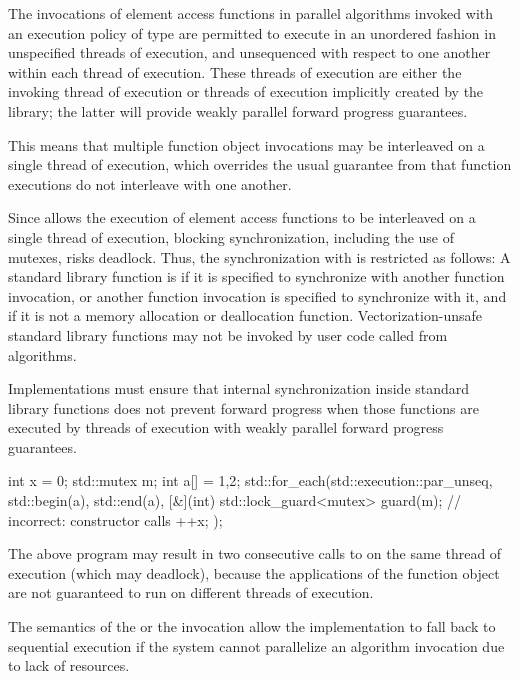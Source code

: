 \pnum
The invocations of element access functions in parallel algorithms invoked with
an execution policy of type  are
permitted to execute in an unordered fashion in unspecified threads of execution, and
unsequenced with respect to one another within each thread of execution.
These threads of execution are either the invoking thread of execution or threads of
execution implicitly created by the library; the latter will provide weakly parallel
forward progress guarantees.
\begin{note}
This means that multiple function object invocations may be interleaved on a
single thread of execution, which overrides the usual guarantee from 
that function executions do not interleave with one another.
\end{note}
Since  allows the execution of element
access functions to be interleaved on a single thread of execution, blocking synchronization,
including the use of mutexes, risks deadlock. Thus, the synchronization with
 is restricted as
follows:
A standard library function is  if it is specified
to synchronize with another function invocation, or another function invocation
is specified to synchronize with it, and if it is not a memory allocation or
deallocation function. Vectorization-unsafe standard library functions may not
be invoked by user code called from 
algorithms.
\begin{note}
Implementations must ensure that internal synchronization inside standard
library functions does not prevent forward progress when those functions are
executed by threads of execution with weakly parallel forward progress guarantees.
\end{note}
\begin{example}
\begin{codeblock}
int x = 0;
std::mutex m;
int a[] = {1,2};
std::for_each(std::execution::par_unseq, std::begin(a), std::end(a), [&](int) {
  std::lock_guard<mutex> guard(m); // incorrect:  constructor calls 
  ++x;
});
\end{codeblock}
The above program may result in two consecutive calls to  on
the same thread of execution (which may deadlock), because the applications of the function
object are not guaranteed to run on different threads of execution.
\end{example}
\begin{note}
The semantics of the  or the
 invocation allow the implementation to
fall back to sequential execution if the system cannot parallelize an algorithm
invocation due to lack of resources.
\end{note}

